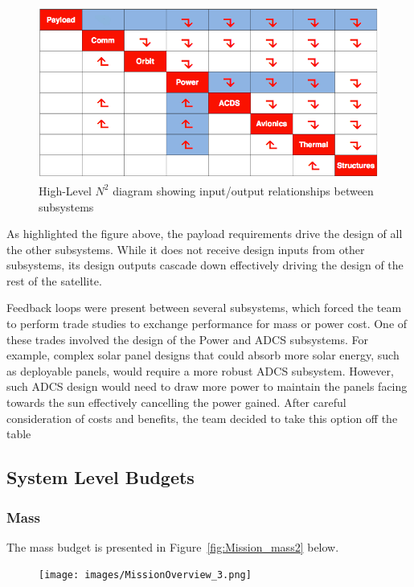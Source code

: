 \documentclass[12pt]{article}
\begin{document}
		\begin{figure}[!ht]
				\centering
				\includegraphics[width=5in]{images/MissionOverview_2.png}
				\caption{High-Level $N^2$ diagram showing input/output relationships between subsystems}
				\label{fig:Mission_N2}
			\end{figure}
			
		As highlighted the figure above, the payload requirements drive the design of all the other subsystems. While it does not receive design inputs from other subsystems, its design outputs cascade down effectively driving the design of the rest of the satellite. 

Feedback loops were present between several subsystems, which forced the team to perform trade studies to exchange performance for mass or power cost. One of these trades involved the design of the Power and ADCS subsystems. For example, complex solar panel designs that could absorb more solar energy, such as deployable panels, would require a more robust ADCS subsystem. However, such ADCS design would need to draw more power to maintain the panels facing towards the sun effectively cancelling the power gained. After careful consideration of costs and benefits, the team decided to take this option off the table
	
	\subsection{System Level Budgets}
		\subsubsection{Mass}
		The mass budget is presented in Figure~\ref{fig:Mission_mass2} below. 
			\begin{figure}[!ht]
				\centering
				\texttt{[image: images/MissionOverview\_3.png]}
				\label{fig:Mission_mass1}
			\end{figure}
		
\end{document}
